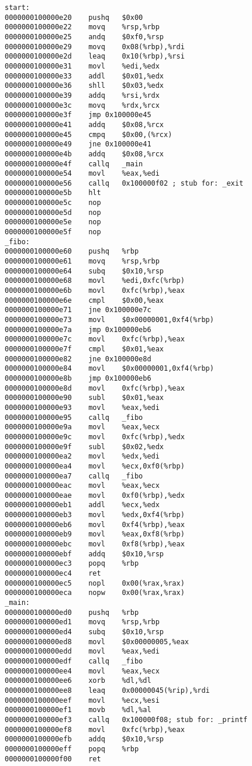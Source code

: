 
\begin{lstlisting}[caption=\texttt{fibo} en assembleur, label=fiboasm, keywordstyle=\color{black}]
start:
0000000100000e20	pushq	$0x00
0000000100000e22	movq	%rsp,%rbp
0000000100000e25	andq	$0xf0,%rsp
0000000100000e29	movq	0x08(%rbp),%rdi
0000000100000e2d	leaq	0x10(%rbp),%rsi
0000000100000e31	movl	%edi,%edx
0000000100000e33	addl	$0x01,%edx
0000000100000e36	shll	$0x03,%edx
0000000100000e39	addq	%rsi,%rdx
0000000100000e3c	movq	%rdx,%rcx
0000000100000e3f	jmp	0x100000e45
0000000100000e41	addq	$0x08,%rcx
0000000100000e45	cmpq	$0x00,(%rcx)
0000000100000e49	jne	0x100000e41
0000000100000e4b	addq	$0x08,%rcx
0000000100000e4f	callq	_main
0000000100000e54	movl	%eax,%edi
0000000100000e56	callq	0x100000f02	; stub for: _exit
0000000100000e5b	hlt
0000000100000e5c	nop
0000000100000e5d	nop
0000000100000e5e	nop
0000000100000e5f	nop
_fibo:
0000000100000e60	pushq	%rbp
0000000100000e61	movq	%rsp,%rbp
0000000100000e64	subq	$0x10,%rsp
0000000100000e68	movl	%edi,0xfc(%rbp)
0000000100000e6b	movl	0xfc(%rbp),%eax
0000000100000e6e	cmpl	$0x00,%eax
0000000100000e71	jne	0x100000e7c
0000000100000e73	movl	$0x00000001,0xf4(%rbp)
0000000100000e7a	jmp	0x100000eb6
0000000100000e7c	movl	0xfc(%rbp),%eax
0000000100000e7f	cmpl	$0x01,%eax
0000000100000e82	jne	0x100000e8d
0000000100000e84	movl	$0x00000001,0xf4(%rbp)
0000000100000e8b	jmp	0x100000eb6
0000000100000e8d	movl	0xfc(%rbp),%eax
0000000100000e90	subl	$0x01,%eax
0000000100000e93	movl	%eax,%edi
0000000100000e95	callq	_fibo
0000000100000e9a	movl	%eax,%ecx
0000000100000e9c	movl	0xfc(%rbp),%edx
0000000100000e9f	subl	$0x02,%edx
0000000100000ea2	movl	%edx,%edi
0000000100000ea4	movl	%ecx,0xf0(%rbp)
0000000100000ea7	callq	_fibo
0000000100000eac	movl	%eax,%ecx
0000000100000eae	movl	0xf0(%rbp),%edx
0000000100000eb1	addl	%ecx,%edx
0000000100000eb3	movl	%edx,0xf4(%rbp)
0000000100000eb6	movl	0xf4(%rbp),%eax
0000000100000eb9	movl	%eax,0xf8(%rbp)
0000000100000ebc	movl	0xf8(%rbp),%eax
0000000100000ebf	addq	$0x10,%rsp
0000000100000ec3	popq	%rbp
0000000100000ec4	ret
0000000100000ec5	nopl	0x00(%rax,%rax)
0000000100000eca	nopw	0x00(%rax,%rax)
_main:
0000000100000ed0	pushq	%rbp
0000000100000ed1	movq	%rsp,%rbp
0000000100000ed4	subq	$0x10,%rsp
0000000100000ed8	movl	$0x00000005,%eax
0000000100000edd	movl	%eax,%edi
0000000100000edf	callq	_fibo
0000000100000ee4	movl	%eax,%ecx
0000000100000ee6	xorb	%dl,%dl
0000000100000ee8	leaq	0x00000045(%rip),%rdi
0000000100000eef	movl	%ecx,%esi
0000000100000ef1	movb	%dl,%al
0000000100000ef3	callq	0x100000f08; stub for: _printf
0000000100000ef8	movl	0xfc(%rbp),%eax
0000000100000efb	addq	$0x10,%rsp
0000000100000eff	popq	%rbp
0000000100000f00	ret
\end{lstlisting}